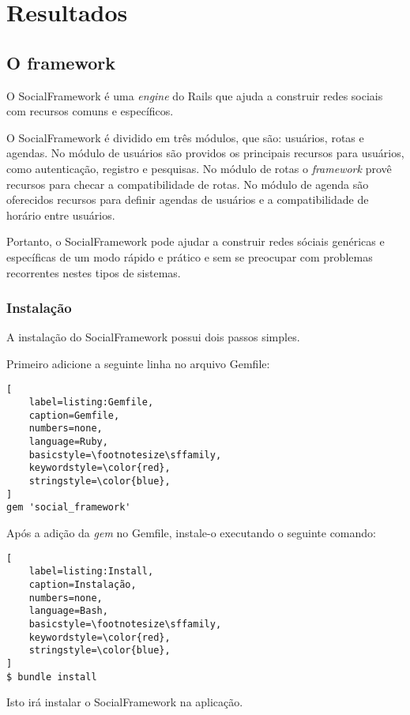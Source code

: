 \chapter{Resultados}
\label{chapter:Resultados}

\section{O framework}

O SocialFramework é uma \textit{engine} do Rails que ajuda a construir redes sociais com recursos comuns e específicos.

O SocialFramework é dividido em três módulos, que são: usuários, rotas e agendas. No módulo de usuários são providos os principais recursos para usuários, como autenticação, registro e pesquisas. No módulo de rotas o \textit{framework} provê recursos para checar a compatibilidade de rotas. No módulo de agenda são oferecidos recursos para definir agendas de usuários e a compatibilidade de horário entre usuários.

Portanto, o SocialFramework pode ajudar a construir redes sóciais genéricas e específicas de um modo rápido e prático e sem se preocupar com problemas recorrentes nestes tipos de sistemas.

\subsection{Instalação}

A instalação do SocialFramework possui dois passos simples.

Primeiro adicione a seguinte linha no arquivo Gemfile:

\begin{lstlisting}[
    label=listing:Gemfile,
    caption=Gemfile,
    numbers=none,
    language=Ruby,
    basicstyle=\footnotesize\sffamily,
    keywordstyle=\color{red},
    stringstyle=\color{blue},
]
gem 'social_framework'
\end{lstlisting}

Após a adição da \textit{gem} no Gemfile, instale-o executando o seguinte comando:

\begin{lstlisting}[
    label=listing:Install,
    caption=Instalação,
    numbers=none,
    language=Bash,
    basicstyle=\footnotesize\sffamily,
    keywordstyle=\color{red},
    stringstyle=\color{blue},
]
$ bundle install
\end{lstlisting}

Isto irá instalar o SocialFramework na aplicação.

